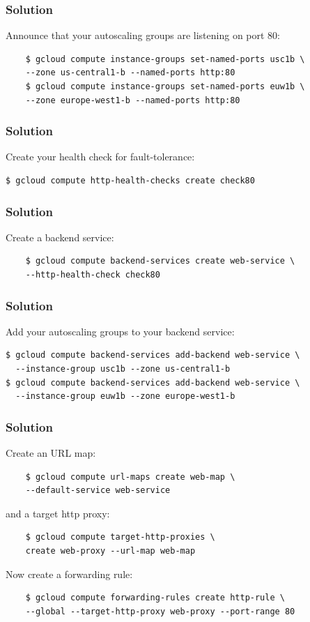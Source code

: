 \documentclass[9pt]{beamer}
\begin{document}
\begin{frame}[fragile]
  \frametitle{Solution}
  Announce that your autoscaling groups are listening on port 80:
  \begin{verbatim}
    $ gcloud compute instance-groups set-named-ports usc1b \
    --zone us-central1-b --named-ports http:80
    $ gcloud compute instance-groups set-named-ports euw1b \
    --zone europe-west1-b --named-ports http:80
  \end{verbatim}
\end{frame}

\begin{frame}[fragile]
  \frametitle{Solution}
  Create your health check for fault-tolerance:
  \begin{verbatim}
$ gcloud compute http-health-checks create check80
  \end{verbatim}
\end{frame}

\begin{frame}[fragile]
  \frametitle{Solution}
  Create a backend service:
  \begin{verbatim}
    $ gcloud compute backend-services create web-service \
    --http-health-check check80
  \end{verbatim}
\end{frame}

\begin{frame}[fragile]
  \frametitle{Solution}
  Add your autoscaling groups to your backend service:
  \begin{verbatim}
$ gcloud compute backend-services add-backend web-service \
  --instance-group usc1b --zone us-central1-b
$ gcloud compute backend-services add-backend web-service \
  --instance-group euw1b --zone europe-west1-b
  \end{verbatim}
\end{frame}

\begin{frame}[fragile]
  \frametitle{Solution}
  Create an URL map:
  \begin{verbatim}
    $ gcloud compute url-maps create web-map \
    --default-service web-service
  \end{verbatim}
  and a target http proxy:
  \begin{verbatim}
    $ gcloud compute target-http-proxies \
    create web-proxy --url-map web-map
  \end{verbatim}
\end{frame}

\begin{frame}[fragile]
  Now create a forwarding rule:
  \begin{verbatim}
    $ gcloud compute forwarding-rules create http-rule \
    --global --target-http-proxy web-proxy --port-range 80
  \end{verbatim}
\end{frame}
\end{document}
